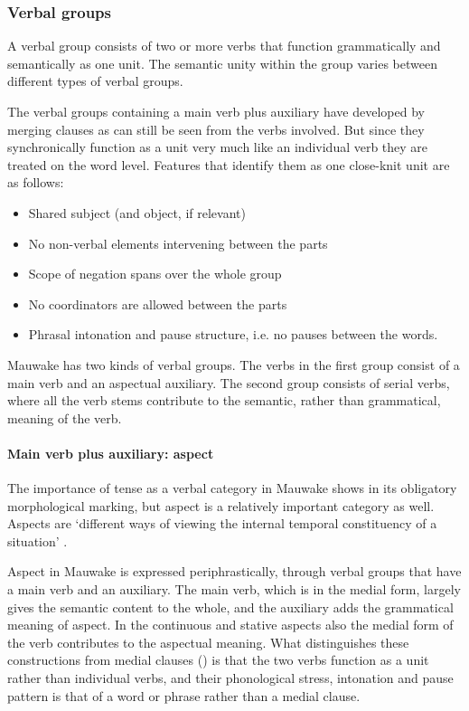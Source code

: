 \subsubsection{Verbal groups}\label{sec:3.8.5.1}
{}
A verbal group consists of two or more verbs that function grammatically and semantically as one unit. The semantic unity within the group varies between different types of verbal groups. 

The verbal groups containing a main verb plus auxiliary have developed by merging clauses as can still be seen from the verbs involved. But since they synchronically function as a unit very much like an individual verb they are treated on the word level. Features that identify them as one close-knit unit are as follows:

\begin{itemize}
\item Shared subject (and object, if relevant)
\item No non-verbal elements intervening between the parts
\item Scope of negation spans over the whole group
\item No coordinators are allowed between the parts
\item Phrasal intonation and pause structure, i.e. no pauses between the words.
\end{itemize}

Mauwake has two kinds of verbal groups. The verbs in the first group consist of a main verb and an aspectual auxiliary. The second group consists of serial verbs, where all the verb stems contribute to the semantic, rather than grammatical, meaning of the verb.

\paragraph{Main verb plus auxiliary: aspect}\label{sec:3.8.5.1.1}
{}
The importance of tense as a verbal category in Mauwake shows in its obligatory morphological marking, but aspect is a relatively important category as well. Aspects are `{different ways of viewing the internal temporal constituency of a situation}' \citep[3]{Comrie1976}. 

Aspect in Mauwake is expressed periphrastically, through verbal groups that have a main verb and an auxiliary. The main verb, which is in the medial form, largely gives the semantic content to the whole, and the auxiliary adds the grammatical meaning of aspect. In the continuous and stative aspects also the medial form of the  verb contributes to the aspectual meaning. What distinguishes these constructions from medial clauses () is that the two verbs function as a unit rather than individual verbs, and their phonological stress, intonation and pause pattern is that of a word or phrase rather than a medial clause. 

